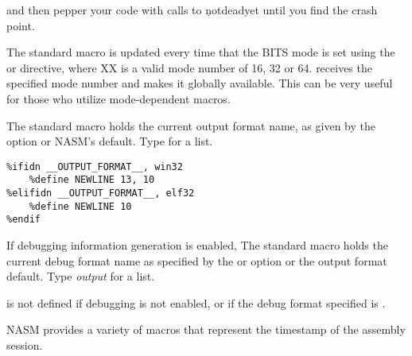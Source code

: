 and then pepper your code with calls to \c{notdeadyet} until you
find the crash point.


The  standard macro is updated every time that the BITS
mode is set using the  or \code{[BITS XX]} directive,
where XX is a valid mode number of 16, 32 or 64.  receives
the specified mode number and makes it globally available. This can be very
useful for those who utilize mode-dependent macros.


The  standard macro holds the current output
format name, as given by the  option or NASM's default. Type
 for a list.

\begin{lstlisting}
%ifidn __OUTPUT_FORMAT__, win32
    %define NEWLINE 13, 10
%elifidn __OUTPUT_FORMAT__, elf32
    %define NEWLINE 10
%endif
\end{lstlisting}


If debugging information generation is enabled, The
 standard macro holds the current
debug format name as specified by the  or  option
or the output format default. Type  \emph{output}
 for a list.

 is not defined if debugging is not
enabled, or if the debug format specified is .


NASM provides a variety of macros that represent the timestamp of the
assembly session.

